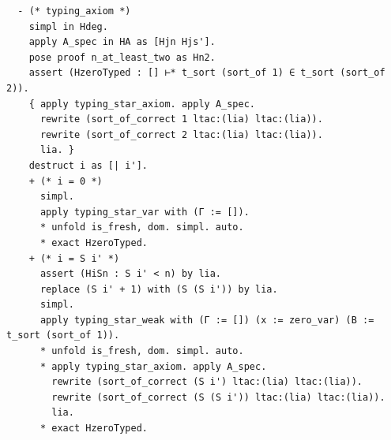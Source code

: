 \begin{latin}
\begin{verbatim}
  - (* typing_axiom *)
    simpl in Hdeg.
    apply A_spec in HA as [Hjn Hjs'].
    pose proof n_at_least_two as Hn2.
    assert (HzeroTyped : [] ⊢* t_sort (sort_of 1) ∈ t_sort (sort_of 2)).
    { apply typing_star_axiom. apply A_spec.
      rewrite (sort_of_correct 1 ltac:(lia) ltac:(lia)).
      rewrite (sort_of_correct 2 ltac:(lia) ltac:(lia)).
      lia. }
    destruct i as [| i'].
    + (* i = 0 *)
      simpl.
      apply typing_star_var with (Γ := []).
      * unfold is_fresh, dom. simpl. auto.
      * exact HzeroTyped.
    + (* i = S i' *)
      assert (HiSn : S i' < n) by lia.
      replace (S i' + 1) with (S (S i')) by lia.
      simpl.
      apply typing_star_weak with (Γ := []) (x := zero_var) (B := t_sort (sort_of 1)).
      * unfold is_fresh, dom. simpl. auto.
      * apply typing_star_axiom. apply A_spec.
        rewrite (sort_of_correct (S i') ltac:(lia) ltac:(lia)).
        rewrite (sort_of_correct (S (S i')) ltac:(lia) ltac:(lia)).
        lia.
      * exact HzeroTyped.


\end{verbatim}
\end{latin}
